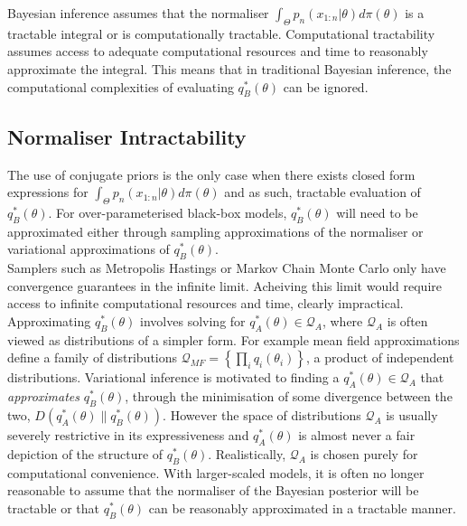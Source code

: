 \documentclass[twoside,11pt]{article}
\begin{document}
Bayesian inference assumes that the normaliser $\int_{\Theta} p_n(x_{1:n}|\theta) d \pi(\theta)$ is a tractable integral or is computationally tractable. Computational tractability assumes access to  adequate computational resources and time to reasonably approximate the integral. This means that in traditional Bayesian inference, the computational complexities of evaluating $q_B^*(\theta)$ can be ignored. 
\subsection{Normaliser Intractability}
The use of conjugate priors is the only case when there exists closed form expressions for $\int_{\Theta} p_n(x_{1:n}|\theta) d \pi(\theta)$ and as such, tractable evaluation of $q_B^*(\theta)$. For over-parameterised black-box models, $q_B^*(\theta)$ will need to be approximated either through sampling approximations of the normaliser or variational approximations of $q_B^*(\theta)$. \\
\newline 
Samplers such as Metropolis Hastings or Markov Chain Monte Carlo only have convergence guarantees in the infinite limit. Acheiving this limit would require access to infinite computational resources and time, clearly impractical. \\
\newline
Approximating $q_B^*(\theta)$ involves solving for $q_A^*(\theta) \in \mathcal{Q}_{A}$, where $\mathcal{Q}_{A}$ is often viewed as distributions of a simpler form. For example mean field approximations define a family of distributions $\mathcal{Q}_{MF} = \left\{\prod_i q_i(\theta_i)\right\}$, a product of independent distributions. Variational inference is motivated to finding a $q_A^*(\theta) \in \mathcal{Q}_{A}$ that \textit{approximates} $q_B^*(\theta)$, through the minimisation of some divergence between the two, $D(q_A^*(\theta)\| q_B^*(\theta))$. However the space of distributions $\mathcal{Q}_{A}$ is usually severely restrictive in its expressiveness and $q_A^*(\theta)$ is almost never a fair depiction of the structure of $q_B^*(\theta)$. Realistically, $\mathcal{Q}_{A}$ is chosen purely for computational convenience. With larger-scaled models, it is often no longer reasonable to assume that the normaliser of the Bayesian posterior will be tractable or that $q_B^*(\theta)$ can be reasonably approximated in a tractable manner.
\end{document}
